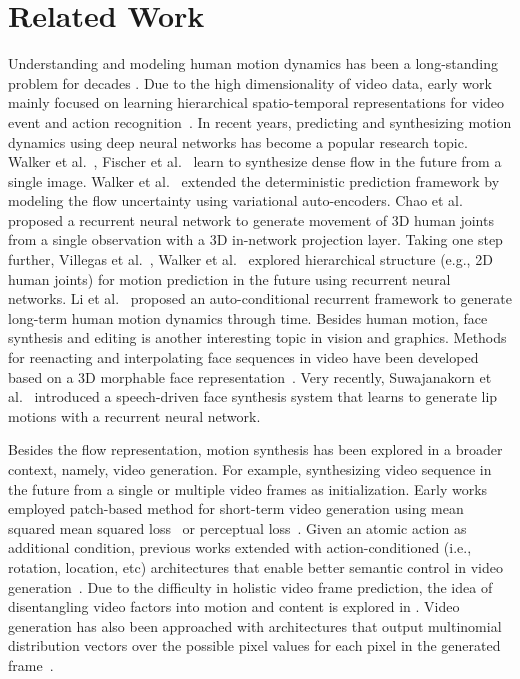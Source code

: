\documentclass[runningheads]{llncs}
\newcommand{\cutsectiondown}{\vspace*{-0.12in}}
\begin{document}
\section{Related Work}
\cutsectiondown
Understanding and modeling human motion dynamics has been a long-standing problem for decades \cite{bregler1997learning,efros2003recognizing,gorelick2007actions}.
Due to the high dimensionality of video data, early work mainly focused on learning hierarchical spatio-temporal representations for video event and action recognition~\cite{laptev2005space,wang2011action,wang2012mining}.
In recent years, predicting and synthesizing motion dynamics using deep neural networks has become a popular research topic.
Walker et al.~\cite{walker2015dense}, Fischer et al.~\cite{fischer2015flownet} learn to synthesize dense flow in the future from a single image.
Walker et al.~\cite{walker2016uncertain} extended the deterministic prediction framework by modeling the flow uncertainty using variational auto-encoders.
Chao et al.~\cite{chao2017forecasting} proposed a recurrent neural network to generate movement of 3D human joints from a single observation with a 3D in-network projection layer.
Taking one step further,  Villegas et al.~\cite{villegas2017learning}, Walker et al.~\cite{walker2017pose} explored hierarchical structure (e.g., 2D human joints) for motion prediction in the future using recurrent neural networks.
Li et al.~\cite{li2017auto} proposed an auto-conditional recurrent framework to generate long-term human motion dynamics through time.
Besides human motion, face synthesis and editing is another interesting topic in vision and graphics.
Methods for reenacting and interpolating face sequences in video have been developed \cite{yang2011expression,yang2012facial,thies2016face2face,elor2017bringingPortraits} based on a 3D morphable face representation~\cite{blanz1999morphable}.
Very recently, Suwajanakorn et al.~\cite{suwajanakorn2017synthesizing} introduced a speech-driven face synthesis system that learns to generate lip motions with a recurrent neural network.


Besides the flow representation, motion synthesis has been explored in a broader context, namely, video generation.
For example, synthesizing video sequence in the future from a single or multiple video frames as initialization.
Early works employed patch-based method for short-term video generation using mean squared mean squared loss~\cite{srivastava2015unsupervised} or perceptual loss~\cite{mathieu2015deep}.
Given an atomic action as additional condition, previous works extended with action-conditioned (i.e., rotation, location, etc) architectures that enable better semantic control in video generation~\cite{hinton2011transforming,Oh15,FinnGL16,yang2015weakly}.
Due to the difficulty in holistic video frame prediction, the idea of disentangling video factors into motion and content is explored in \cite{villegas2017decomposing,denton2017unsupervised,xue2016visual,vondrick2016generating,tulyakov2017mocogan,nevan2018hierarchical}.
Video generation has also been approached with architectures that output multinomial distribution vectors over the possible pixel values for each pixel in the generated frame~\cite{kalchbrenner2016video}.
\end{document}
